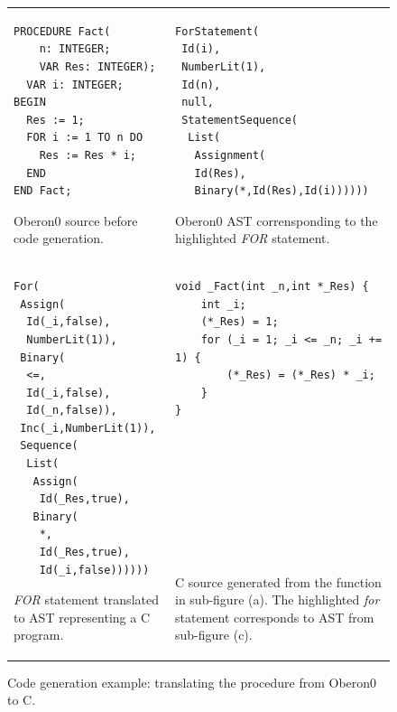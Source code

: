 %
\begin{figure}[!h]
\begin{tabular}{>{\raggedright}p{}>{\centering}p{}}

\begin{lstlisting}[basicstyle={\footnotesize\ttfamily}]
PROCEDURE Fact(
    n: INTEGER;
    VAR Res: INTEGER);
  VAR i: INTEGER;
BEGIN
  Res := 1;
  FOR i := 1 TO n DO
    Res := Res * i;
  END
END Fact;
\end{lstlisting}


\noindent Oberon0 source before code generation.

\noindent \subfloat[\label{fig:codegen-oberonsource}]{}  & 
\begin{lstlisting}[basicstyle={\footnotesize\ttfamily}]
ForStatement(
 Id(i),
 NumberLit(1),
 Id(n),
 null,
 StatementSequence(
  List(
   Assignment(
   Id(Res),
   Binary(*,Id(Res),Id(i))))))
\end{lstlisting}


Oberon0 AST corrensponding to the highlighted \emph{FOR} statement.

\subfloat[\label{fig:codegen-oberon}]{}\tabularnewline

\begin{lstlisting}[basicstyle={\footnotesize\ttfamily}]
For(
 Assign(
  Id(_i,false),
  NumberLit(1)),
 Binary(
  <=,
  Id(_i,false),
  Id(_n,false)),
 Inc(_i,NumberLit(1)),
 Sequence(
  List(
   Assign(
    Id(_Res,true),
   Binary(
    *,
    Id(_Res,true),
    Id(_i,false))))))
\end{lstlisting}


\emph{FOR} statement translated to AST representing a C program.

\subfloat[\label{fig:codegen-c-ast}]{} & 
\begin{lstlisting}[basicstyle={\footnotesize\ttfamily}]
void _Fact(int _n,int *_Res) {
    int _i;
    (*_Res) = 1;
    for (_i = 1; _i <= _n; _i += 1) {
        (*_Res) = (*_Res) * _i;
    }
}
 
 
 
 
 
 
 
 
\end{lstlisting}


C source generated from the function in sub-figure (a). The highlighted
\emph{for} statement corresponds to AST from sub-figure (c).

\subfloat[\label{fig:codegen-c-text}]{}\tabularnewline
\end{tabular}

\caption{\label{fig:code-generation}Code generation example: translating the
procedure from Oberon0 to C.}

\end{figure}



